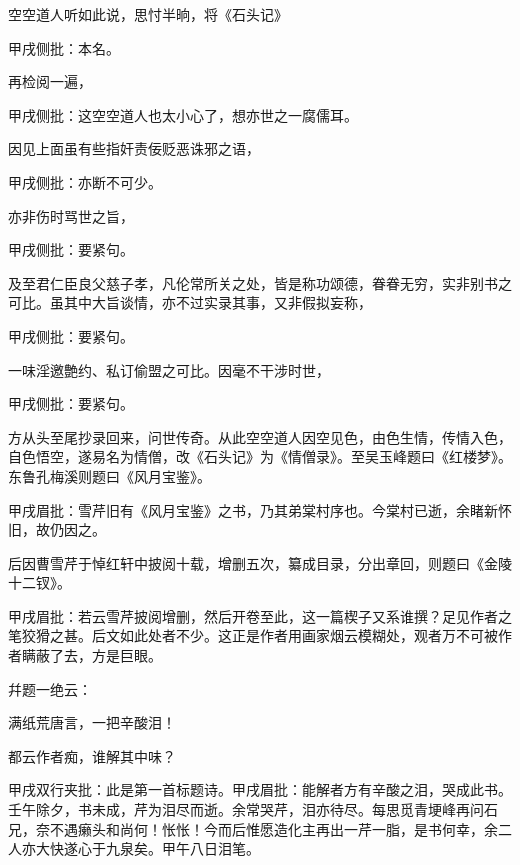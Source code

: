 \begin{parag}
    空空道人听如此说，思忖半晌，将《石头记》\begin{note}甲戌侧批：本名。\end{note}再检阅一遍，\begin{note}甲戌侧批：这空空道人也太小心了，想亦世之一腐儒耳。\end{note}因见上面虽有些指奸责佞贬恶诛邪之语，\begin{note}甲戌侧批：亦断不可少。\end{note}亦非伤时骂世之旨，\begin{note}甲戌侧批：要紧句。\end{note}及至君仁臣良父慈子孝，凡伦常所关之处，皆是称功颂德，眷眷无穷，实非别书之可比。虽其中大旨谈情，亦不过实录其事，又非假拟妄称，\begin{note}甲戌侧批：要紧句。\end{note}一味淫邀艶约、私订偷盟之可比。因毫不干涉时世，\begin{note}甲戌侧批：要紧句。\end{note}方从头至尾抄录回来，问世传奇。从此空空道人因空见色，由色生情，传情入色，自色悟空，遂易名为情僧，改《石头记》为《情僧录》。至吴玉峰题曰《红楼梦》。东鲁孔梅溪则题曰《风月宝鉴》。\begin{note}甲戌眉批：雪芹旧有《风月宝鉴》之书，乃其弟棠村序也。今棠村已逝，余睹新怀旧，故仍因之。\end{note}后因曹雪芹于悼红轩中披阅十载，增删五次，纂成目录，分出章回，则题曰《金陵十二钗》。\begin{note}甲戌眉批：若云雪芹披阅增删，然后开卷至此，这一篇楔子又系谁撰？足见作者之笔狡猾之甚。后文如此处者不少。这正是作者用画家烟云模糊处，观者万不可被作者瞒蔽了去，方是巨眼。\end{note}幷题一绝云：
\end{parag}


\begin{poem}
    \begin{pl}满纸荒唐言，一把辛酸泪！\end{pl}

    \begin{pl}都云作者痴，谁解其中味？\end{pl}
    \begin{note}甲戌双行夹批：此是第一首标题诗。甲戌眉批：能解者方有辛酸之泪，哭成此书。壬午除夕，书未成，芹为泪尽而逝。余常哭芹，泪亦待尽。每思觅青埂峰再问石兄，奈不遇癞头和尚何！怅怅！今而后惟愿造化主再出一芹一脂，是书何幸，余二人亦大快遂心于九泉矣。甲午八日泪笔。\end{note}
\end{poem}


